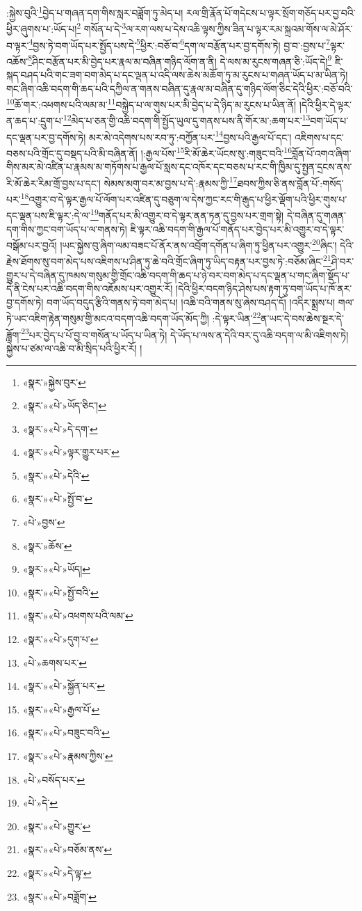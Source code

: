 :སྐྱེས་བུའི་\footnote{«སྣར་»སྐྱེས་བུར་}བྱེད་པ་གཞན་དག་གིས་སླར་བཟློག་ཏུ་མེད་པ། རལ་གྲི་རྣོན་པོ་གདེངས་པ་ལྟར་སྲོག་གཅོད་པར་བྱ་བའི་ཕྱིར་ཞུགས་པ་:ཡོད་པ།\footnote{«སྣར་»«པེ་»ཡོད་ཅིང་།} གསོན་པ་དེ་\footnote{«སྣར་»«པེ་»དེ་དག་}ལ་རག་ལས་པ་དེས་འཆི་ལྟས་ཀྱིས་ཟིན་པ་ལྟར་རམ་སྐྲའམ་གོས་ལ་མེ་ཤོར་བ་ལྟར་\footnote{«སྣར་»«པེ་»ལྟར་གྱུར་པར་}བྱས་ཏེ་བག་ཡོད་པར་སྤྱོད་པས་དེ་\footnote{«སྣར་»«པེ་»དེའི་}ཕྱིར་:བཅོ་བ་\footnote{«སྣར་»«པེ་»སྤྱོ་བ་}དག་ལ་བརྩོན་པར་བྱ་དགོས་ཏེ། བྱ་བ་:བྱས་པ་\footnote{«པེ་»བྱས་}ལྟར་འཆོས་\footnote{«སྣར་»ཆོས་}ཤིང་བརྩོན་པར་མི་བྱེད་པར་རྣལ་མ་བཞིན་གཉིད་ལོག་ན་ནི། དེ་ལས་མ་རུངས་གཞན་ཅི་:ཡོད་དེ།\footnote{«སྣར་»«པེ་»ཡོད།} ཇི་སྐད་བཤད་པའི་གང་ཟག་བག་མེད་པ་དང་ལྡན་པ་འདི་ལས་ཆེས་མཆོག་ཏུ་མ་རུངས་པ་གཞན་ཡོད་པ་མ་ཡིན་ཏེ། གང་ཞིག་འཆི་བདག་གི་ཆད་པའི་དཀྱིལ་ན་གནས་བཞིན་དུ་རྣལ་མ་བཞིན་དུ་གཉིད་ལོག་ཅིང་དེའི་ཕྱིར་:བཅོ་བའི་\footnote{«སྣར་»«པེ་»སྤྱོ་བའི་}ཆོ་གར་:འཕགས་པའི་ལམ་མ་\footnote{«སྣར་»«པེ་»འཕགས་པའི་ལམ་}བསྐྱེད་པ་ལ་གུས་པར་མི་བྱེད་པ་དེ་ཉིད་མ་རུངས་པ་ཡིན་ནོ། །དེའི་ཕྱིར་དེ་ལྟར་ན་ཆད་པ་:དྲུག་པ་\footnote{«སྣར་»«པེ་»དུག་པ་}མེད་པ་ཅན་གྱི་འཆི་བདག་གི་སྤྱོད་ཡུལ་དུ་གནས་པས་ནི་གོར་མ་:ཆག་པར་\footnote{«པེ་»ཆགས་པར་}བག་ཡོད་པ་དང་ལྡན་པར་བྱ་དགོས་ཏེ། མར་མེ་འདེགས་པས་རབ་ཏུ་:བཀྱོན་པར་\footnote{«སྣར་»«པེ་»སྐྱོན་པར་}བྱས་པའི་རྒྱལ་པོ་དང་། འཇིགས་པ་དང་བཅས་པའི་གྲོང་དུ་བསྡད་པའི་མི་བཞིན་ནོ། །:རྒྱལ་པོས་\footnote{«སྣར་»«པེ་»རྒྱལ་པོ་}རི་མོ་ཆེར་ཡོངས་སུ་:གཟུང་བའི་\footnote{«སྣར་»«པེ་»བཟུང་བའི་}བློན་པོ་འགའ་ཞིག་གིས་མར་མེ་འཛིན་པ་རྣམས་མ་གཏོགས་པ་རྒྱལ་པོ་སླས་དང་འཁོར་དང་བཅས་པ་རང་གི་ཁྱིམ་དུ་སྤྱན་དྲངས་ནས་རི་མོ་ཆེར་རིམ་གྲོ་བྱས་པ་དང་། སེམས་མགུ་བར་མ་བྱས་པ་དེ་:རྣམས་ཀྱི་\footnote{«སྣར་»«པེ་»རྣམས་ཀྱིས་}ཐབས་ཀྱིས་ཅི་ནས་བློན་པོ་:གསོད་པར་\footnote{«པེ་»བསོད་པར་}འགྱུར་བ་དེ་ལྟར་རྒྱལ་པོ་ལོག་པར་འཛིན་དུ་བཅུག་ལ་དེས་ཀྱང་རང་གི་རྒུད་པ་ཕྱིར་ལྡོག་པའི་ཕྱིར་གུས་པ་དང་ལྡན་པས་ཇི་ལྟར་:དེ་ལ་\footnote{«པེ་»དེ་}གནོད་པར་མི་འགྱུར་བ་དེ་ལྟར་ནན་ཏན་དུ་བྱས་པར་གྲག་སྟེ། དེ་བཞིན་དུ་གཞན་དག་གིས་ཀྱང་བག་ཡོད་པ་ལ་གནས་ཏེ། ཇི་ལྟར་འཆི་བདག་གི་རྒྱལ་པོ་གནོད་པར་བྱེད་པར་མི་འགྱུར་བ་དེ་ལྟར་བསྒོམ་པར་བྱའོ། །ཡང་སྐྱེས་བུ་ཞིག་ལམ་བཟང་པོ་ནོར་ནས་འབྲོག་དགོན་པ་ཞིག་ཏུ་ཕྱིན་པར་འགྱུར་\footnote{«སྣར་»«པེ་»གྱུར་}ཞིང་། དེའི་རྗེས་ཐོགས་སུ་བག་མེད་པས་འཇིགས་པ་ཤིན་ཏུ་ཆེ་བའི་གྲོང་ཞིག་ཏུ་ཡིད་བརྟན་པར་བྱས་ཏེ་:བཅོམ་ཞིང་\footnote{«སྣར་»«པེ་»བཅོམ་ནས་}ཤི་བར་གྱུར་པ་དེ་བཞིན་དུ་ཁམས་གསུམ་གྱི་གྲོང་འཆི་བདག་གི་ཆད་པ་ཉེ་བར་བག་མེད་པ་དང་ལྡན་པ་གང་ཞིག་སྡོད་པ་དེ་ནི་ངེས་པར་འཆི་བདག་གིས་འཇོམས་པར་འགྱུར་རོ། །དེའི་ཕྱིར་བདག་ཉིད་ཤེས་པས་རྟག་ཏུ་བག་ཡོད་པ་ཁོ་ནར་བྱ་དགོས་ཏེ། བག་ཡོད་བདུད་རྩིའི་གནས་ཏེ་བག་མེད་པ། །འཆི་བའི་གནས་སུ་ཞེས་བཤད་དོ། །འདིར་སྨྲས་པ། གལ་ཏེ་ཡང་འཇིག་རྟེན་གསུམ་གྱི་མངའ་བདག་འཆི་བདག་ཡོད་མོད་ཀྱི། :དེ་ལྟར་ཡིན་\footnote{«སྣར་»«པེ་»དེ་ལྟ་}ན་ཡང་དེ་བས་ཆེས་སྔར་དེ་ཟློག་\footnote{«སྣར་»«པེ་»བཟློག་}པར་བྱེད་པ་པོ་བྱ་བ་གསོན་པ་ཡོད་པ་ཡིན་ཏེ། དེ་ཡོད་པ་ལས་ན་དེའི་བར་དུ་འཆི་བདག་ལ་མི་འཇིགས་ཏེ། སྐྱེས་པ་ཙམ་ལ་འཆི་བ་མི་སྲིད་པའི་ཕྱིར་རོ། །
